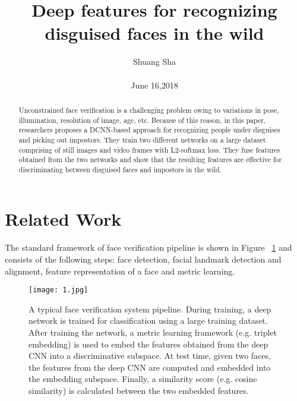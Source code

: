 \documentclass[10pt,twocolumn,letterpaper]{article}
\begin{document}
\title{Deep features for recognizing disguised faces in the wild}

\author{Shuang Sha \\\\ June 16,2018}

\maketitle

\begin{abstract}
  Unconstrained face verification is a challenging problem owing to variations in pose, illumination, resolution of image, age, etc. Because of this reason, in this paper, researchers proposes a DCNN-based approach for recognizing people under disguises and picking out impostors. They train two different networks on a large dataset comprising of still images and video frames with L2-softmax loss. They fuse features obtained from the two networks and show that the resulting features are effective for discriminating between disguised faces and impostors in the wild.
\end{abstract}

\section{Related Work}

The standard framework of face verification pipeline is shown in Figure ~\ref{fig:onecol} and consists of the following steps: face detection, facial landmark detection and alignment, feature representation of a face and metric learning.

\begin{figure}[!htpb]
\begin{center}
   \texttt{[image: 1.jpg]}
\end{center}
   \caption{A typical face verification system pipeline. During training, a deep network is trained for classification using a large training dataset. After training the network, a metric learning framework (e.g. triplet embedding) is used to embed the features obtained from the deep CNN into a discriminative subspace. At test time, given two faces, the features from the deep CNN are computed and embedded into the embedding subspace. Finally, a similarity score (e.g. cosine similarity) is calculated between the two embedded features.}
\label{fig:onecol}
\end{figure}
\end{document}
